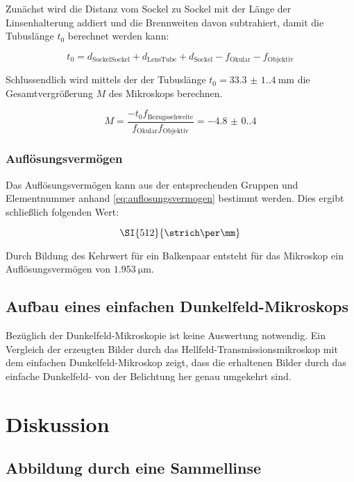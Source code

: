 \documentclass[12pt,english,ngerman]{scrartcl}
\begin{document}
Zunächst wird die Distanz vom Sockel zu Sockel mit der Länge der
Linsenhalterung addiert und die Brennweiten davon subtrahiert, damit die
Tubuslänge $t_0$ berechnet werden kann:

\begin{equation}
	t_0 = d_\text{SockelSockel} + d_\text{LensTube} + d_\text{Sockel} - f_\text{Okular} - f_\text{Objektiv}
\end{equation}

Schlussendlich wird mittels der der Tubuslänge $t_0=\SI{33.3(1.4)}{\mm}$ die
Gesamtvergrößerung $M$ des Mikroskops berechnen.

\begin{equation}
	M=\frac{-t_0 f_\text{Bezugssehweite}}{f_\text{Okular} f_\text{Objektiv}} = \num{-4.8(0.4)}
\end{equation}

\subsubsection{Auflösungsvermögen}

Das Auflösungsvermögen kann aus der entsprechenden Gruppen und Elementnummer
anhand \autoref{eq:auflosungsvermogen} bestimmt werden. Dies ergibt schließlich
folgenden Wert:

\begin{equation}
	\SI{512}{\strich\per\mm}
\end{equation}

Durch Bildung des Kehrwert für ein Balkenpaar entsteht für das Mikroskop ein
Auflösungsvermögen von $\SI{1.953}{\um}$.

\subsection{Aufbau eines einfachen Dunkelfeld-Mikroskops}

Bezüglich der Dunkelfeld-Mikroskopie ist keine Auswertung notwendig. Ein
Vergleich der erzeugten Bilder durch das Hellfeld-Transmissionsmikroskop mit
dem einfachen Dunkelfeld-Mikroskop zeigt, dass die erhaltenen Bilder durch das
einfache Dunkelfeld- von der Belichtung her genau umgekehrt sind.%

\section{Diskussion}\label{sec:diskussion}

\subsection{Abbildung durch eine Sammellinse}
\end{document}
